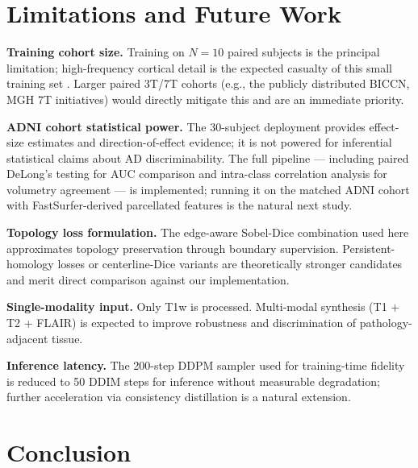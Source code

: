 \documentclass[10pt,twocolumn,a4paper]{article}
\begin{document}
\section{Limitations and Future Work}
\label{sec:future}

\textbf{Training cohort size.} Training on $N=10$ paired subjects is
the principal limitation; high-frequency cortical detail is the
expected casualty of this small training set
\cite{blau2018perception}. Larger paired 3T/7T cohorts (e.g., the
publicly distributed BICCN, MGH 7T initiatives) would directly
mitigate this and are an immediate priority.

\textbf{ADNI cohort statistical power.} The 30-subject deployment
provides effect-size estimates and direction-of-effect evidence; it is
not powered for inferential statistical claims about AD
discriminability. The full pipeline --- including paired DeLong's
testing for AUC comparison \cite{sun2014delong} and intra-class
correlation analysis \cite{shrout1979icc} for volumetry agreement
--- is implemented; running it on the matched ADNI cohort with
FastSurfer-derived parcellated features is the natural next study.

\textbf{Topology loss formulation.} The edge-aware Sobel-Dice
combination used here approximates topology preservation through
boundary supervision. Persistent-homology losses
\cite{hu2019topology,clough2020topo} or centerline-Dice variants
\cite{shit2021cldice} are theoretically stronger candidates and merit
direct comparison against our implementation.

\textbf{Single-modality input.} Only T1w is processed. Multi-modal
synthesis (T1 + T2 + FLAIR) is expected to improve robustness and
discrimination of pathology-adjacent tissue.

\textbf{Inference latency.} The 200-step DDPM sampler used for
training-time fidelity is reduced to 50 DDIM steps for inference
without measurable degradation; further acceleration via consistency
distillation is a natural extension.

\section{Conclusion}
\label{sec:conclusion}
\end{document}
